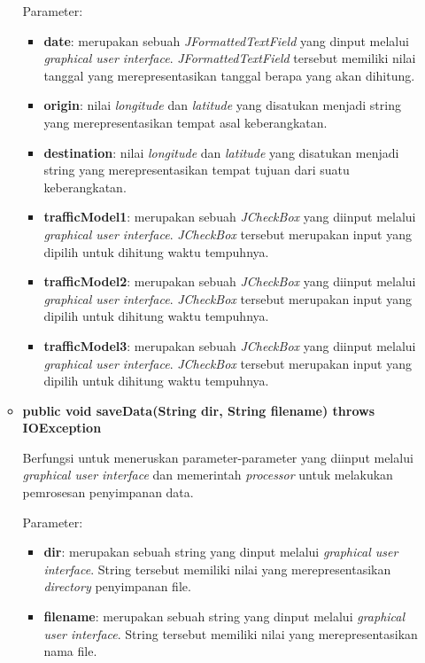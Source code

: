 \begin{enumerate}
\begin{itemize}
		Parameter:
	\begin{itemize}
		\item \textbf{date}: merupakan sebuah \textit{JFormattedTextField} yang dinput melalui \textit{graphical user interface}. \textit{JFormattedTextField} tersebut memiliki nilai tanggal yang merepresentasikan tanggal berapa yang akan dihitung. 
		\item \textbf{origin}: nilai \textit{longitude} dan \textit{latitude} yang disatukan menjadi string yang merepresentasikan tempat asal keberangkatan.
		\item \textbf{destination}: nilai \textit{longitude} dan \textit{latitude} yang disatukan menjadi string yang merepresentasikan tempat tujuan dari suatu keberangkatan.
		\item \textbf{trafficModel1}: merupakan sebuah \textit{JCheckBox} yang diinput melalui \textit{graphical user interface}. \textit{JCheckBox} tersebut merupakan input yang dipilih untuk dihitung waktu tempuhnya.
		\item \textbf{trafficModel2}: merupakan sebuah \textit{JCheckBox} yang diinput melalui \textit{graphical user interface}. \textit{JCheckBox} tersebut merupakan input yang dipilih untuk dihitung waktu tempuhnya.
		\item \textbf{trafficModel3}: merupakan sebuah \textit{JCheckBox} yang diinput melalui \textit{graphical user interface}. \textit{JCheckBox} tersebut merupakan input yang dipilih untuk dihitung waktu tempuhnya.
	\end{itemize}
		
		\item \textbf{public void saveData(String dir, String filename) throws IOException}
		
		Berfungsi untuk meneruskan parameter-parameter yang diinput melalui \textit{graphical user interface} dan memerintah \textit{processor} untuk melakukan pemrosesan penyimpanan data.
		
		Parameter:
	\begin{itemize}
		\item \textbf{dir}: merupakan sebuah string yang dinput melalui \textit{graphical user interface}. String tersebut memiliki nilai yang merepresentasikan \textit{directory} penyimpanan file. 
		\item \textbf{filename}: merupakan sebuah string yang dinput melalui \textit{graphical user interface}. String tersebut memiliki nilai yang merepresentasikan nama file.
	\end{itemize}
	\end{itemize}
	

\end{enumerate}

